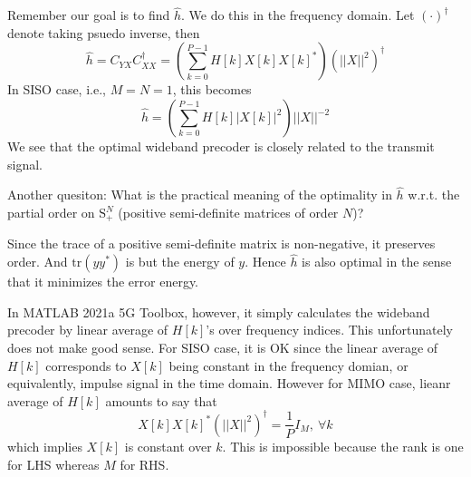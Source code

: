 \documentclass[12pt]{article}
\theoremstyle{definition}
\begin{document}
Remember our goal is to find $\hat{h}$. We do this in the frequency domain. Let $(\cdot )^{\dagger}$ denote taking psuedo inverse, then
$$\hat{h}=C_{YX}C_{XX}^{\dagger}=\left(\sum_{k=0}^{P-1}H[k]X[k]X[k]^* \right)\left(||X||^2 \right)^{\dagger}$$
In SISO case, i.e., $M=N=1$, this becomes
$$\hat{h}=\left(\sum_{k=0}^{P-1}H[k]|X[k]|^2 \right)||X||^{-2}$$
We see that the optimal wideband precoder is closely related to the transmit signal.

Another quesiton: What is the practical meaning of the optimality in $\hat{h}$ w.r.t. the partial order on $\mbox{S}_+^N$ (positive semi-definite matrices of order $N$)? 

Since the trace of a positive semi-definite matrix is non-negative, it preserves order. And $\mbox{tr}\left(yy^*\right)$ is but the energy of $y$. Hence $\hat{h}$ is also optimal in the sense that it minimizes the error energy.

In MATLAB 2021a 5G Toolbox, however, it simply calculates the wideband precoder by linear average of $H[k]$'s over frequency indices. This unfortunately does not make good sense. For SISO case, it is OK since the linear average of $H[k]$ corresponds to $X[k]$ being constant in the frequency domian, or equivalently, impulse signal in the time domain. However for MIMO case, lieanr average of $H[k]$ amounts to say that
$$X[k]X[k]^*\left(||X||^2 \right)^{\dagger}=\frac{1}{P}I_M,\ \forall k$$
which implies $X[k]$ is constant over $k$. This is impossible because the rank is one for LHS whereas $M$ for RHS.
\end{document}
